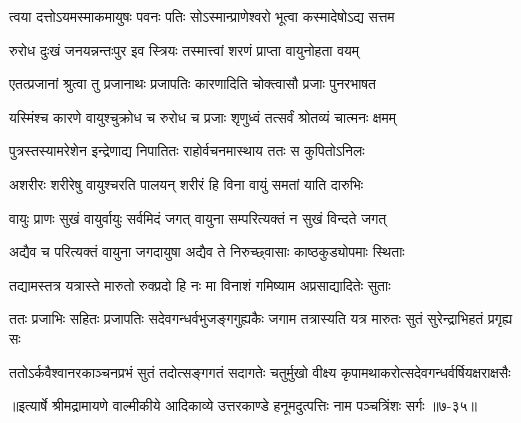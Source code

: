 \twolineshloka
{त्वया दत्तोऽयमस्माकमायुषः पवनः पतिः}
{सोऽस्मान्प्राणेश्वरो भूत्वा कस्मादेषोऽद्य सत्तम} %

\twolineshloka
{रुरोध दुःखं जनयन्नन्तःपुर इव स्त्रियः}
{तस्मात्त्वां शरणं प्राप्ता वायुनोहता वयम्} %

\twolineshloka
{एतत्प्रजानां श्रुत्वा तु प्रजानाथः प्रजापतिः}
{कारणादिति चोक्त्वासौ प्रजाः पुनरभाषत} %

\twolineshloka
{यस्मिंश्च कारणे वायुश्चुक्रोध च रुरोध च}
{प्रजाः शृणुध्वं तत्सर्वं श्रोतव्यं चात्मनः क्षमम्} %

\twolineshloka
{पुत्रस्तस्यामरेशेन इन्द्रेणाद्य निपातितः}
{राहोर्वचनमास्थाय ततः स कुपितोऽनिलः} %

\twolineshloka
{अशरीरः शरीरेषु वायुश्चरति पालयन्}
{शरीरं हि विना वायुं समतां याति दारुभिः} %

\twolineshloka
{वायुः प्राणः सुखं वायुर्वायुः सर्वमिदं जगत्}
{वायुना सम्परित्यक्तं न सुखं विन्दते जगत्} %

\twolineshloka
{अद्यैव च परित्यक्तं वायुना जगदायुषा}
{अद्यैव ते निरुच्छ्वासाः काष्ठकुड्योपमाः स्थिताः} %

\twolineshloka
{तद्यामस्तत्र यत्रास्ते मारुतो रुक्प्रदो हि नः}
{मा विनाशं गमिष्याम अप्रसाद्यादितेः सुताः} %

\twolineshloka
{ततः प्रजाभिः सहितः प्रजापतिः सदेवगन्धर्वभुजङ्गगुह्यकैः}
{जगाम तत्रास्यति यत्र मारुतः सुतं सुरेन्द्राभिहतं प्रगृह्य सः} %

\twolineshloka
{ततोऽर्कवैश्वानरकाञ्चनप्रभं सुतं तदोत्सङ्गगतं सदागतेः}
{चतुर्मुखो वीक्ष्य कृपामथाकरोत्सदेवगन्धर्वर्षियक्षराक्षसैः} %


॥इत्यार्षे श्रीमद्रामायणे वाल्मीकीये आदिकाव्ये उत्तरकाण्डे हनूमदुत्पत्तिः नाम पञ्चत्रिंशः सर्गः ॥७-३५॥
